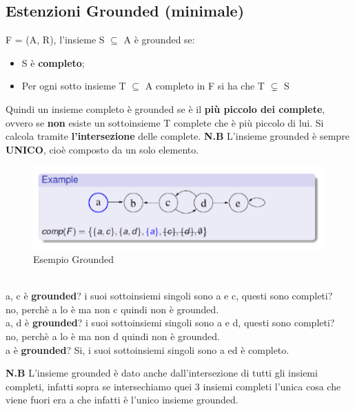 \subsection{Estenzioni Grounded (minimale)}
F = (A, R), l’insieme S $\subseteq$ A è grounded se:
\begin{itemize}
    \item S è \textbf{completo};
    \item Per ogni sotto insieme T $\subseteq$ A completo in F si ha che T $\subsetneq$ S
\end{itemize}
Quindi un insieme completo è grounded se è il \textbf{più piccolo dei complete}, ovvero se \textbf{non} esiste un sottoinsieme T complete che è più piccolo di lui. Si calcola tramite \textbf{l’intersezione} delle complete.
\textbf{N.B} L’insieme grounded è sempre \textbf{UNICO}, cioè composto da un solo elemento.
\begin{figure}[htp]
	\centering
    \includegraphics[width=12cm, keepaspectratio]{img/Cap6/completo.png}
    \caption{Esempio Grounded}
\end{figure}
\\a, c è \textbf{grounded}? i suoi sottoinsiemi singoli sono a e c, questi sono completi?
\\no, perchè a lo è ma non c quindi non è grounded.
\\a, d è \textbf{grounded}? i suoi sottoinsiemi singoli sono a e d, questi sono completi?
\\no, perchè a lo è ma non d quindi non è grounded.
\\a è \textbf{grounded}? Si, i suoi sottoinsiemi singoli sono a ed è completo.

\vspace{0.8cm}

\textbf{N.B} L’insieme grounded è dato anche dall’intersezione di tutti gli insiemi completi, infatti sopra se intersechiamo quei 3 insiemi completi l’unica cosa che viene fuori era a che infatti è l’unico insieme grounded.
\newpage
